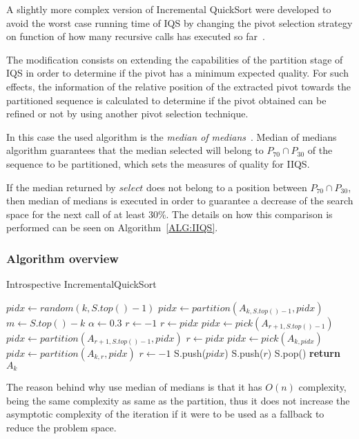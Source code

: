 A slightly more complex version of Incremental QuickSort were developed to avoid the worst case running time of IQS by changing the pivot selection strategy on function of how many recursive calls has executed so far~\cite{7416566}.

The modification consists on extending the capabilities of the partition stage of IQS in order to determine if the pivot has a minimum expected quality. For such effects, the information of the relative position of the extracted pivot towards the partitioned sequence is calculated to determine if the pivot obtained can be refined or not by using another pivot selection technique.

In this case the used algorithm is the \textit{median of medians}~\cite{Blum_Floyd_Pratt_Rivest_Tarjan_1973}. Median of medians algorithm guarantees that the median selected will belong to $P_{70} \cap P_{30}$ of the sequence to be partitioned, which sets the measures of quality for IIQS. 

If the median returned by $select$ does not belong to a position between $P_{70} \cap P_{30}$, then median of medians is executed in order to guarantee a decrease of the search space for the next call of at least 30\%. The details on how this comparison is performed can be seen on Algorithm~\ref{ALG:IIQS}.

\subsubsection{Algorithm overview}
\begin{algorithm}
  \begin{algorithmic}[1]
    \caption{Introspective IncrementalQuickSort}\label{ALG:IIQS}
    \State $pidx \gets random(k,S.top()-1)$
    \State $pidx \gets partition(A_{k,S.top()-1}, pidx)$
    \State $m \gets S.top() - k$
    \State $\alpha \gets 0.3$
    \State $r \gets -1$
    \State $r \gets pidx$
    \State $pidx \gets pick(A_{r+1,S.top()-1})$
    \State $pidx \gets partition(A_{r+1,S.top()-1},pidx)$
    \State $r \gets pidx$
    \State $pidx \gets pick(A_{k,pidx})$
    \State $pidx \gets partition(A_{k,r}, pidx)$
    \State $r \gets -1$
    \EndIf
    \State S.push($pidx$)
    \State S.push($r$)
    \EndIf
    \EndWhile
    \State S.pop()
    \State \textbf{return} $A_{k}$\label{IIQS_main_cycle}
    \EndProcedure
  \end{algorithmic}
\end{algorithm}

The reason behind why use median of medians is that it has $O(n)$ complexity, being the same complexity as same as the partition, thus it does not increase the asymptotic complexity of the iteration if it were to be used as a fallback to reduce the problem space.